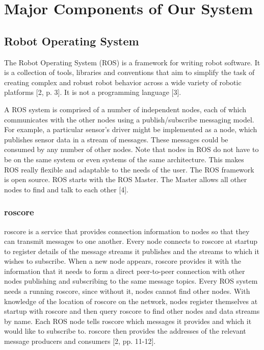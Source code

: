 \documentclass[journal]{IEEEtran}
\begin{document}

\section{Major Components of Our System}

\subsection{Robot Operating System}
The Robot Operating System (ROS) is a framework for writing robot software. It is a collection of tools, libraries and conventions that aim to simplify the task of creating complex and robust robot behavior across a wide variety of robotic platforms [2, p. 3]. It is not a programming language [3]. 

A ROS system is comprised of a number of independent nodes, each of which communicates with the other nodes using a publish/subscribe messaging model. For example, a particular sensor’s driver might be implemented as a node, which publishes sensor data in a stream of messages. These messages could be consumed by any number of other nodes.
Note that nodes in ROS do not have to be on the same system or even systems of the same architecture. This makes ROS really flexible and adaptable to the needs of the user. The ROS framework is open source.
ROS starts with the ROS Master. The Master allows all other nodes to find and talk to each other [4]. 

\subsubsection{roscore}
roscore is a service that provides connection information to nodes so that they can
transmit messages to one another. Every node connects to roscore at startup to register
details of the message streams it publishes and the streams to which it wishes to subscribe.
When a new node appears, roscore provides it with the information that it needs to form a
direct peer-to-peer connection with other nodes publishing and subscribing to the same
message topics. Every ROS system needs a running roscore, since without it, nodes
cannot find other nodes.
With knowledge of the location of roscore on the network, nodes register themselves at
startup with roscore and then query roscore to find other nodes and data streams by
name. Each ROS node tells roscore which messages it provides and which it would like
to subscribe to. roscore then provides the addresses of the relevant message producers
and consumers [2, pp. 11-12].
\end{document}

